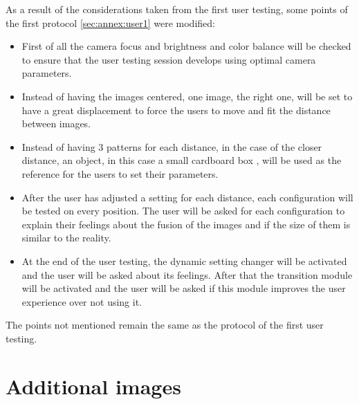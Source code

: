 \documentclass[10pt,a4paper,twocolumn,twoside]{article}
\begin{document}
	As a result of the considerations taken from the first user testing, some points of the first protocol \ref{sec:annex:user1} were modified:
	\begin{itemize}
		\item First of all the camera focus and brightness and color balance will be checked to ensure that the user testing session develops using optimal camera parameters.
		
		\item Instead of having the images centered, one image, the right one, will be set to have a great displacement to force the users to move and fit the distance between images. 
		
		\item Instead of having 3 patterns for each distance, in the case of the closer distance, an object, in this case a small cardboard box , will be used as the reference for the users to set their parameters. 
		
		\item After the user has adjusted a setting for each distance, each configuration will be tested on every position. The user will be asked for each configuration to explain their feelings about the fusion of the images and if the size of them is similar to the reality. 
		
		\item At the end of the user testing, the dynamic setting changer will be activated and the user will be asked about its feelings. After that the transition module will be activated and the user will be asked if this module improves the user experience over not using it.  
	
	\end{itemize}

	The points not mentioned remain the same as the protocol of the first user testing.  
	
	\section{Additional images}
	
\end{document}
